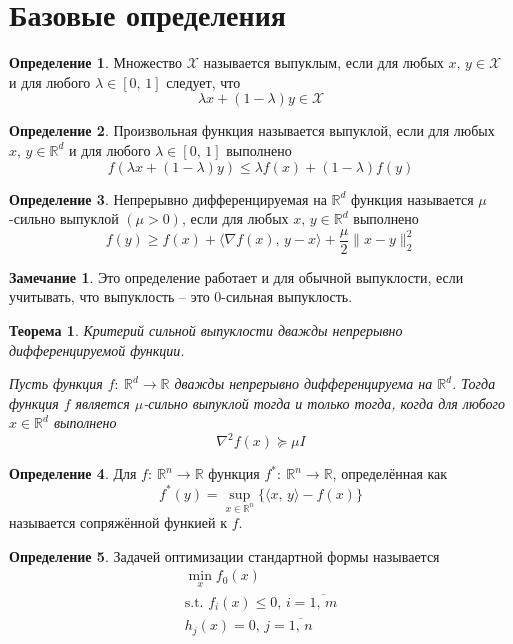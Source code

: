 \documentclass[a4paper,12pt]{article}
\renewcommand{\leq}{\ensuremath{\leqslant}}
\renewcommand{\geq}{\ensuremath{\geqslant}}
\theoremstyle{plain}
\newtheorem{theorem}{Теорема}[section]
\theoremstyle{definition}
\newtheorem{definition}{Определение}[section]
\newtheorem*{note}{Замечание}
\theoremstyle{remark}
\begin{document}
\tableofcontents
\newpage

\section{Базовые определения}
\begin{definition}
	Множество $\mathcal{X}$ называется выпуклым, если для любых $x,\, y \in \mathcal{X}$ и для любого $\lambda \in [0,\, 1]$ следует, что
	\[
		\lambda x + (1 - \lambda)y \in \mathcal{X}
	\]
\end{definition}

\begin{definition}
	Произвольная функция называется выпуклой, если для любых $x,\, y \in \mathbb{R}^d$ и для любого $\lambda \in [0,\,1]$ выполнено
	\[
		f(\lambda x + (1 - \lambda)y) \leq \lambda f(x) + (1 - \lambda)f(y)
	\]
\end{definition}

\begin{definition}
	Непрерывно дифференцируемая на $\mathbb{R}^d$ функция называется $\mu$-сильно выпуклой $(\mu > 0)$, если для любых $x,\, y \in \mathbb{R}^d$ выполнено
	\[
		f(y) \geq f(x) + \langle\nabla f(x),\, y - x\rangle + \frac{\mu}{2}\|x - y\|_2^2
	\]
\end{definition}

\begin{note}
	Это определение работает и для обычной выпуклости, если учитывать, что выпуклость -- это 0-сильная выпуклость.
\end{note}

\begin{theorem}
	Критерий сильной выпуклости дважды непрерывно дифференцируемой функции.

	Пусть функция $f:\: \mathbb{R}^d \to \mathbb{R}$ дважды непрерывно дифференцируема на $\mathbb{R}^d$. Тогда функция $f$ является $\mu$-сильно выпуклой тогда и только тогда, когда для любого $x \in \mathbb{R}^d$ выполнено
	\[
		\nabla^2 f(x) \succeq \mu I
	\]
\end{theorem}

\begin{definition}
	Для $f:\: \mathbb{R}^n \to \mathbb{R}$ функция $f^* :\: \mathbb{R}^n \to \mathbb{R}$, определённая как
	\[
		f^*(y) = \sup_{x \in \mathbb{R}^n} \{\langle x,\,y\rangle - f(x)\}
	\]
	называется сопряжённой функией к $f$.
\end{definition}

\begin{definition}
	Задачей оптимизации стандартной формы называется
	\begin{align}\label{CondTask}
		\min_x f_0(x)                                      \\
		\text{s.t. } f_i(x) \leq 0,\, i = \overline{1,\,m} \\
		h_j(x) = 0,\, j = \overline{1,\,n}
	\end{align}
\end{definition}
\end{document}
